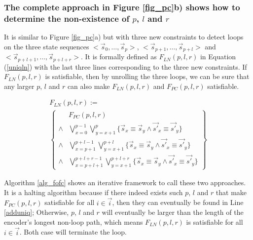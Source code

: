 \documentclass[conference]{IEEEtran}
\begin{document}
\subsubsection{The complete approach in Figure \ref{fig_pc}b) shows how to determine the non-existence of $p$, $l$ and $r$}\label{subsub_complete}

It is similar to Figure \ref{fig_pc}a) but with three new constraints to detect loops 
on the three state sequences $<\vec{s}_{0},\dots,\vec{s}_{p}>$, $<\vec{s}_{p+1},\dots,\vec{s}_{p+l}>$ and 
$<\vec{s}_{p+l+1},\dots,\vec{s}_{p+l+r}>$.
It is formally defined as $F_{LN}(p,l,r)$ in Equation (\ref{uniqln}) 
with the last three lines corresponding to the three new constraints.
If $F_{LN}(p,l,r)$ is satisfiable,
then by unrolling the three loops,
we can be sure that any larger  $p$, $l$ and $r$ can also make $F_{LN}(p,l,r)$ and $F_{PC}(p,l,r)$ satisfiable.

\begin{multline}\label{uniqln}
F_{LN}(p,l,r):=\\
\left\{
\begin{array}{cc}
&F_{PC}(p,l,r)\\
\wedge&\bigvee_{x=0}^{p-1}\bigvee_{y=x+1}^{p} \{\vec{s}_x\equiv \vec{s}_y\wedge \vec{s'}_x\equiv \vec{s'}_y\} \\
\wedge&\bigvee_{x=p+1}^{p+l-1}\bigvee_{y=x+1}^{p+l} \{\vec{s}_x\equiv \vec{s}_y\wedge \vec{s'}_x\equiv \vec{s'}_y\} \\
\wedge&\bigvee_{x=p+l+1}^{p+l+r-1}\bigvee_{y=x+1}^{p+l+r} \{\vec{s}_x\equiv \vec{s}_y\wedge \vec{s'}_x\equiv \vec{s'}_y\}
\end{array}
\right\}
\end{multline}

Algorithm \ref{alg_fofc} shows an iterative framework to call these two approaches.
It is a halting algorithm because if there indeed exists such $p$, $l$ and $r$ that make $F_{PC}(p,l,r)$ satisfiable for all $i\in\vec{i}$,
then they can eventually be found in Line \ref{adduniq};
Otherwise,
$p$, $l$ and $r$ will eventually be larger than the length of the encoder's longest non-loop path,
which means $F_{LN}(p,l,r)$ is satisfiable for all $i\in\vec{i}$.
Both case will terminate the loop.
\end{document}
